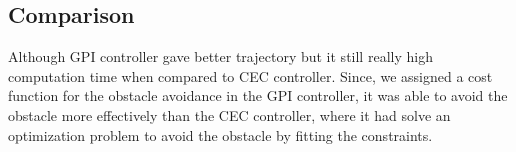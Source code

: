 \documentclass[conference]{IEEEtran}
\begin{document}
\subsection{Comparison}
Although GPI controller gave better trajectory but it still really high computation time when compared to CEC controller.
Since, we assigned a cost function for the obstacle avoidance in the GPI controller, it was able to avoid the obstacle more effectively than the CEC controller, where it had solve an optimization problem to avoid the obstacle by fitting the constraints.
\end{document}
